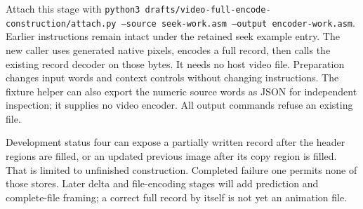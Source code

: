 Attach this stage with
\texttt{python3 drafts/video-full-encode-construction/attach.py --source
  seek-work.asm --output encoder-work.asm}. Earlier instructions remain intact under
the retained seek example entry. The new caller uses generated native pixels,
encodes a full record, then calls the existing record decoder on those bytes.
It needs no host video file. Preparation changes input words and context controls
without changing instructions. The fixture helper can also export the numeric
source words as JSON for independent inspection; it supplies no video encoder.
All output commands refuse an existing file.

Development status four can expose a partially written record after the header
regions are filled, or an updated previous image after its copy region is filled.
That is limited to unfinished construction. Completed failure one permits none
of those stores. Later delta and file-encoding stages will add prediction and
complete-file framing; a correct full record by itself is not yet an animation file.
